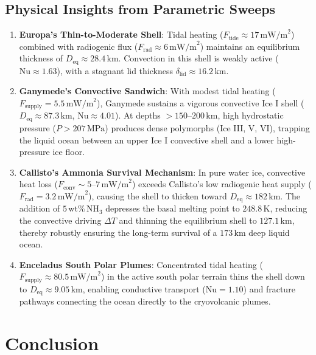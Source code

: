 \documentclass[10pt,twocolumn,letterpaper]{article}
\begin{document}
\subsection{Physical Insights from Parametric Sweeps}
\begin{enumerate}
    \item \textbf{Europa's Thin-to-Moderate Shell}: Tidal heating ($F_{\mathrm{tide}} \approx 17\,\text{mW/m}^2$) combined with radiogenic flux ($F_{\mathrm{rad}} \approx 6\,\text{mW/m}^2$) maintains an equilibrium thickness of $D_{\mathrm{eq}} \approx 28.4\,\text{km}$. Convection in this shell is weakly active ($\mathrm{Nu} \approx 1.63$), with a stagnant lid thickness $\delta_{\mathrm{lid}} \approx 16.2\,\text{km}$.
    \item \textbf{Ganymede's Convective Sandwich}: With modest tidal heating ($F_{\mathrm{supply}} = 5.5\,\text{mW/m}^2$), Ganymede sustains a vigorous convective Ice I shell ($D_{\mathrm{eq}} \approx 87.3\,\text{km}$, $\mathrm{Nu} \approx 4.01$). At depths $>150\text{--}200\,\text{km}$, high hydrostatic pressure ($P > 207\,\text{MPa}$) produces dense polymorphs (Ice III, V, VI), trapping the liquid ocean between an upper Ice I convective shell and a lower high-pressure ice floor.
    \item \textbf{Callisto's Ammonia Survival Mechanism}: In pure water ice, convective heat loss ($F_{\mathrm{conv}} \sim 5\text{--}7\,\text{mW/m}^2$) exceeds Callisto's low radiogenic heat supply ($F_{\mathrm{rad}} = 3.2\,\text{mW/m}^2$), causing the shell to thicken toward $D_{\mathrm{eq}} \approx 182\,\text{km}$. The addition of $5\,\text{wt}\%\,\mathrm{NH}_3$ depresses the basal melting point to $248.8\,\text{K}$, reducing the convective driving $\Delta T$ and thinning the equilibrium shell to $127.1\,\text{km}$, thereby robustly ensuring the long-term survival of a $173\,\text{km}$ deep liquid ocean.
    \item \textbf{Enceladus South Polar Plumes}: Concentrated tidal heating ($F_{\mathrm{supply}} \approx 80.5\,\text{mW/m}^2$) in the active south polar terrain thins the shell down to $D_{\mathrm{eq}} \approx 9.05\,\text{km}$, enabling conductive transport ($\mathrm{Nu} = 1.10$) and fracture pathways connecting the ocean directly to the cryovolcanic plumes.
\end{enumerate}

\section{Conclusion}
\end{document}
